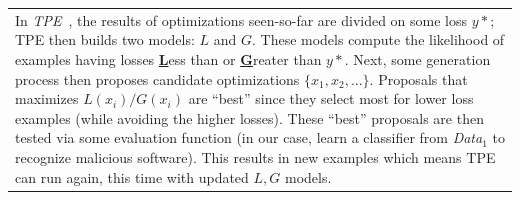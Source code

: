 \documentclass{NSF}
\begin{document}
\begin{nsfdescription}
\begin{table}[!htbp]
\small
\begin{tabular}{|p{.99\linewidth}|}\hline
\rowcolor{blue!10}
In \textit{TPE}~\cite{bergstra2011algorithms},
the results of optimizations seen-so-far are divided on some loss  $y*$;
 TPE then builds two models: $L$ and $G$. These  models compute the likelihood of examples  having losses \underline{{\bf L}}ess than or \underline{{\bf G}}reater than $y*$. 
Next, some generation process then proposes  candidate optimizations $\{x_1,x_2,...\}$. Proposals that maximizes ${L(x_i)/G(x_i)}$   are ``best'' since they select
most for    lower loss examples  
(while   avoiding  the higher losses). These 
``best'' proposals are then  tested via some evaluation function (in our case, learn a classifier from {\em Data$_1$}  to recognize malicious software).  
This results in new examples which means TPE can run again, this time with  updated  $L,G$ models.\\


\end{tabular}
\end{table}
\end{nsfdescription}
\end{document}
